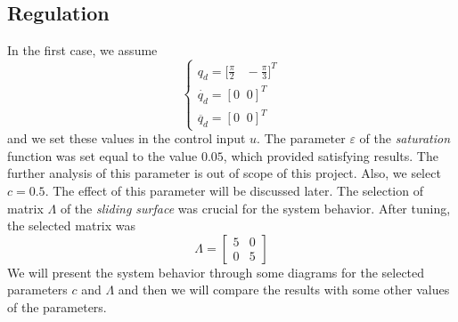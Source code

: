 \documentclass[a4paper]{article}
\begin{document}
\subsection{Regulation}
In the first case, we assume 
$$
    \begin{cases}
        q_d = \big[ \frac{\pi}{2} \;\;\; -\frac{\pi}{3} \big]^T \\
        \dot{q_d} = [0 \;\; 0]^T \\
        \ddot{q_d} = [0 \;\; 0]^T
    \end{cases}
$$
and we set these values in the control input $u$. The parameter $\varepsilon$ of the \textit{saturation} function was 
set equal to the value $0.05$, which provided satisfying results. The further analysis of this parameter is out of scope 
of this project. Also, we select $c = 0.5$. The effect of this parameter will be discussed later.
The selection of matrix $\Lambda$ of the \textit{sliding surface} was crucial for the system behavior. 
After tuning, the selected matrix was 
$$
    \Lambda = \begin{bmatrix}
        5 & 0 \\
        0 & 5
    \end{bmatrix}
$$
We will present the system behavior through some diagrams for the selected parameters $c$ and $\Lambda$ and then we will compare 
the results with some other values of the parameters.
\end{document}
